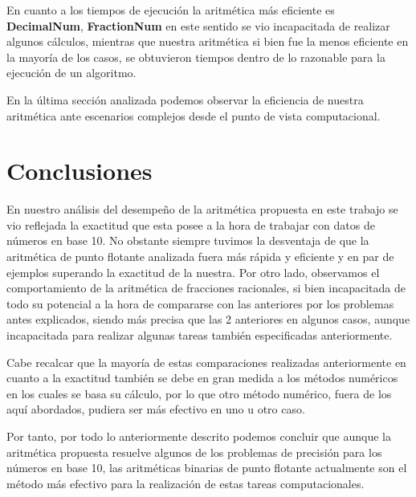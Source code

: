 \documentclass[a4paper,10pt,twocolumn]{article}
\begin{document}
En cuanto a los tiempos de ejecución la aritmética más eficiente es \textbf{DecimalNum}, \textbf{FractionNum} en este sentido se vio incapacitada de realizar algunos cálculos, mientras que nuestra aritmética si bien fue la menos eficiente en la mayoría de los casos, se obtuvieron tiempos dentro de lo razonable para la ejecución de un algoritmo.

En la última sección analizada podemos observar la eficiencia de nuestra aritmética ante escenarios complejos desde el punto de vista computacional.



\section{Conclusiones}\label{sec:conc}

En nuestro análisis del desempeño de la aritmética propuesta en este trabajo se vio reflejada la exactitud que esta posee a la hora de trabajar con datos de números en base 10. No obstante siempre tuvimos la desventaja de que la aritmética de punto flotante analizada fuera más rápida y eficiente y en par de ejemplos superando la exactitud de la nuestra. Por otro lado, observamos el comportamiento de la aritmética de fracciones racionales, si bien incapacitada de todo su potencial a la hora de compararse con las anteriores por los problemas antes explicados, siendo más precisa que las 2 anteriores en algunos casos, aunque incapacitada para realizar algunas tareas también especificadas anteriormente.

Cabe recalcar que la mayoría de estas comparaciones realizadas anteriormente en cuanto a la exactitud también se debe en gran medida a los métodos numéricos en los cuales se basa su cálculo, por lo que otro método numérico, fuera de los aquí abordados, pudiera ser más efectivo en uno u otro caso. 

Por tanto, por todo lo anteriormente descrito podemos concluir que aunque la aritmética propuesta resuelve algunos de los problemas de precisión para los números en base 10, las aritméticas binarias de punto flotante actualmente son el método más efectivo para la realización de estas tareas computacionales.

\end{document}
